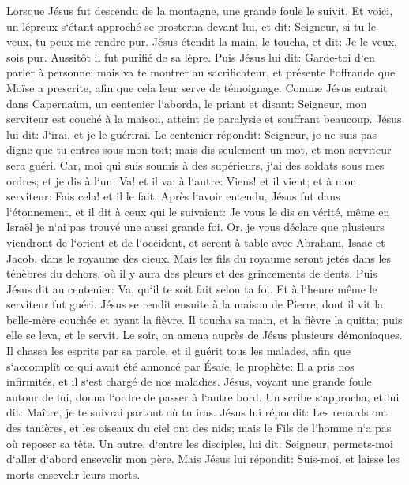 \verse Lorsque Jésus fut descendu de la montagne, une grande foule le suivit. 
\verse Et voici, un lépreux s`étant approché se prosterna devant lui, et dit: Seigneur, si tu le veux, tu peux me rendre pur. 
\verse Jésus étendit la main, le toucha, et dit: Je le veux, sois pur. Aussitôt il fut purifié de sa lèpre. 
\verse Puis Jésus lui dit: Garde-toi d`en parler à personne; mais va te montrer au sacrificateur, et présente l`offrande que Moïse a prescrite, afin que cela leur serve de témoignage. 
\verse Comme Jésus entrait dans Capernaüm, un centenier l`aborda, 
\verse le priant et disant: Seigneur, mon serviteur est couché à la maison, atteint de paralysie et souffrant beaucoup. 
\verse Jésus lui dit: J`irai, et je le guérirai. 
\verse Le centenier répondit: Seigneur, je ne suis pas digne que tu entres sous mon toit; mais dis seulement un mot, et mon serviteur sera guéri. 
\verse Car, moi qui suis soumis à des supérieurs, j`ai des soldats sous mes ordres; et je dis à l`un: Va! et il va; à l`autre: Viens! et il vient; et à mon serviteur: Fais cela! et il le fait. 
\verse Après l`avoir entendu, Jésus fut dans l`étonnement, et il dit à ceux qui le suivaient: Je vous le dis en vérité, même en Israël je n`ai pas trouvé une aussi grande foi. 
\verse Or, je vous déclare que plusieurs viendront de l`orient et de l`occident, et seront à table avec Abraham, Isaac et Jacob, dans le royaume des cieux. 
\verse Mais les fils du royaume seront jetés dans les ténèbres du dehors, où il y aura des pleurs et des grincements de dents. 
\verse Puis Jésus dit au centenier: Va, qu`il te soit fait selon ta foi. Et à l`heure même le serviteur fut guéri. 
\verse Jésus se rendit ensuite à la maison de Pierre, dont il vit la belle-mère couchée et ayant la fièvre. 
\verse Il toucha sa main, et la fièvre la quitta; puis elle se leva, et le servit. 
\verse Le soir, on amena auprès de Jésus plusieurs démoniaques. Il chassa les esprits par sa parole, et il guérit tous les malades, 
\verse afin que s`accomplît ce qui avait été annoncé par Ésaïe, le prophète: Il a pris nos infirmités, et il s`est chargé de nos maladies. 
\verse Jésus, voyant une grande foule autour de lui, donna l`ordre de passer à l`autre bord. 
\verse Un scribe s`approcha, et lui dit: Maître, je te suivrai partout où tu iras. 
\verse Jésus lui répondit: Les renards ont des tanières, et les oiseaux du ciel ont des nids; mais le Fils de l`homme n`a pas où reposer sa tête. 
\verse Un autre, d`entre les disciples, lui dit: Seigneur, permets-moi d`aller d`abord ensevelir mon père. 
\verse Mais Jésus lui répondit: Suis-moi, et laisse les morts ensevelir leurs morts. 
